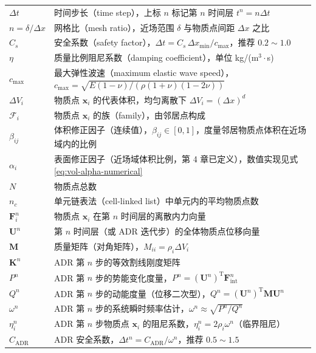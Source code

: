 {\small
\begin{longtable}{@{}p{4.8cm}>{\raggedright\arraybackslash}p{10.2cm}@{}}
  $\Delta t$ & 时间步长（time step），上标 $n$ 标记第 $n$ 时间层 $t^{n}=n\Delta t$ \\
  $n=\delta/\Delta x$ & 网格比（mesh ratio），近场范围 $\delta$ 与物质点间距 $\Delta x$ 之比 \\
  $C_s$ & 安全系数（safety factor），$\Delta t=C_s\,\Delta x_{\min}/c_{\max}$，推荐 $0.2\sim1.0$ \\
  $\eta$ & 质量比例阻尼系数（damping coefficient），单位 kg/(m$^3\cdot$s) \\
  $c_{\max}$ & 最大弹性波速（maximum elastic wave speed），$c_{\max}=\sqrt{E(1-\nu)/(\rho(1+\nu)(1-2\nu))}$ \\
  $\Delta V_i$ & 物质点 $\mathbf{x}_i$ 的代表体积，均匀离散下 $\Delta V_i=(\Delta x)^{d}$ \\
  $\mathcal{F}_i$ & 物质点 $\mathbf{x}_i$ 的族（family），由邻居点构成 \\
  $\beta_{ij}$ & 体积修正因子（连续值），$\beta_{ij}\in[0,1]$，度量邻居物质点体积在近场域内的比例 \\
  $\alpha_i$ & 表面修正因子（近场域体积比例，第 4 章已定义），数值实现见式 \eqref{eq:vol-alpha-numerical} \\
  $N$ & 物质点总数 \\
  $n_c$ & 单元链表法（cell-linked list）中单元内的平均物质点数 \\
  $\mathbf{F}_i^{n}$ & 物质点 $\mathbf{x}_i$ 在第 $n$ 时间层的离散内力向量 \\
  $\mathbf{U}^{n}$ & 第 $n$ 时间层（或 ADR 迭代步）的全体物质点位移向量 \\
  $\mathbf{M}$ & 质量矩阵（对角矩阵），$M_{ii}=\rho_i\Delta V_i$ \\
  $\mathbf{K}^{n}$ & ADR 第 $n$ 步的等效割线刚度矩阵 \\
  $P^{n}$ & ADR 第 $n$ 步的势能变化度量，$P^{n}=(\mathbf{U}^{n})^{\mathrm{T}}\mathbf{F}_{\mathrm{int}}^{n}$ \\
  $Q^{n}$ & ADR 第 $n$ 步的动能度量（位移二次型），$Q^{n}=(\mathbf{U}^{n})^{\mathrm{T}}\mathbf{M}\mathbf{U}^{n}$ \\
  $\omega^{n}$ & ADR 第 $n$ 步的系统瞬时频率估计，$\omega^{n}\approx\sqrt{P^{n}/Q^{n}}$ \\
  $\eta_i^{n}$ & ADR 第 $n$ 步物质点 $\mathbf{x}_i$ 的阻尼系数，$\eta_i^{n}=2\rho_i\omega^{n}$（临界阻尼） \\
  $C_{\text{ADR}}$ & ADR 安全系数，$\Delta t^{n}=C_{\text{ADR}}/\omega^{n}$，推荐 $0.5\sim1.5$ \\

\end{longtable}}
